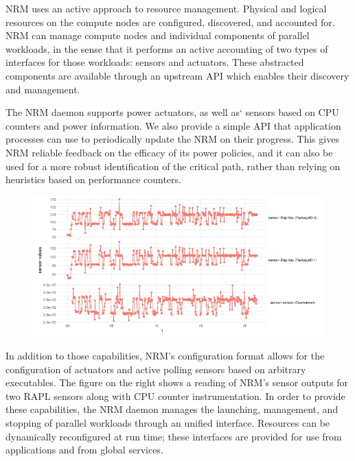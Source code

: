 NRM uses an active approach to resource management. Physical and logical
resources on the compute nodes are configured, discovered, and accounted for.
NRM can manage compute nodes and individual components of parallel workloads,
in the sense that it performs an active accounting of two types of interfaces
for those workloads: sensors and actuators. These abstracted components are
available through an upstream API which enables their discovery and management.

The NRM daemon supports power actuators, as well as` sensors based on CPU counters
and power information. We also provide a simple API that application processes
can use to periodically update the NRM on their progress. This gives NRM
reliable feedback on the efficacy of its power policies, and it can also
be used for a more robust identification of the critical path, rather than
relying on heuristics based on performance counters.

\begin{figure}
  \includegraphics[width=.58\textwidth]{projects/2.3.1-PMR/2.3.1.19-Argo-PowerSteering/sensors}
\end{figure}
In addition to those capabilities, NRM's configuration format allows for
the configuration of actuators and active polling sensors based on arbitrary
executables. The figure on the right shows a reading of NRM's sensor
outputs for two RAPL sensors along with CPU counter instrumentation. In order
to provide these capabilities, the NRM daemon manages the launching, management,
and stopping of parallel workloads through an unified interface. Resources
can be dynamically reconfigured at run time; these interfaces are provided
for use from applications and from global services.

